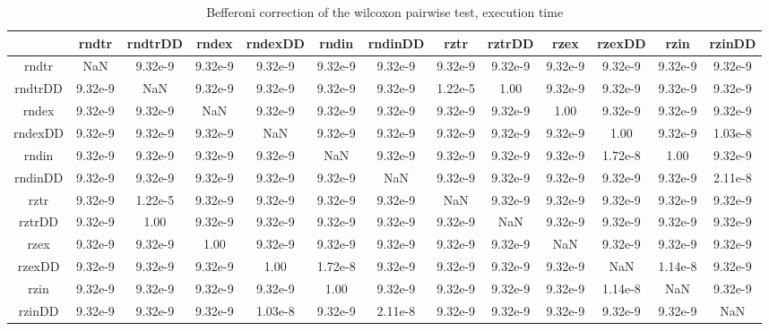 \documentclass[12pt,a4paper]{article}
\begin{document}
\begin{table}[!h]
\leftskip -2.45cm
{
\footnotesize
\begin{tabular}{|*{13}{c|}}
\hline
	~ & rndtr & rndtrDD & rndex & rndexDD & rndin & rndinDD & rztr & rztrDD & rzex & rzexDD & rzin & rzinDD \\
  \hline
	rndtr & NaN & 9.32e-9 & 9.32e-9 & 9.32e-9 & 9.32e-9 & 9.32e-9 & 9.32e-9 & 9.32e-9 & 9.32e-9 & 9.32e-9 & 9.32e-9 & 9.32e-9 \\
	rndtrDD & 9.32e-9 & NaN & 9.32e-9 & 9.32e-9 & 9.32e-9 & 9.32e-9 & 1.22e-5 & 1.00 & 9.32e-9 & 9.32e-9 & 9.32e-9 & 9.32e-9 \\
	rndex & 9.32e-9 & 9.32e-9 & NaN & 9.32e-9 & 9.32e-9 & 9.32e-9 & 9.32e-9 & 9.32e-9 & 1.00 & 9.32e-9 & 9.32e-9 & 9.32e-9 \\
	rndexDD & 9.32e-9 & 9.32e-9 & 9.32e-9 & NaN & 9.32e-9 & 9.32e-9 & 9.32e-9 & 9.32e-9 & 9.32e-9 & 1.00 & 9.32e-9 & 1.03e-8 \\
	rndin & 9.32e-9 & 9.32e-9 & 9.32e-9 & 9.32e-9 & NaN & 9.32e-9 & 9.32e-9 & 9.32e-9 & 9.32e-9 & 1.72e-8 & 1.00 & 9.32e-9 \\
	rndinDD & 9.32e-9 & 9.32e-9 & 9.32e-9 & 9.32e-9 & 9.32e-9 & NaN & 9.32e-9 & 9.32e-9 & 9.32e-9 & 9.32e-9 & 9.32e-9 & 2.11e-8 \\
	rztr & 9.32e-9 & 1.22e-5 & 9.32e-9 & 9.32e-9 & 9.32e-9 & 9.32e-9 & NaN & 9.32e-9 & 9.32e-9 & 9.32e-9 & 9.32e-9 & 9.32e-9 \\
	rztrDD & 9.32e-9 & 1.00 & 9.32e-9 & 9.32e-9 & 9.32e-9 & 9.32e-9 & 9.32e-9 & NaN & 9.32e-9 & 9.32e-9 & 9.32e-9 & 9.32e-9 \\
	rzex & 9.32e-9 & 9.32e-9 & 1.00 & 9.32e-9 & 9.32e-9 & 9.32e-9 & 9.32e-9 & 9.32e-9 & NaN & 9.32e-9 & 9.32e-9 & 9.32e-9 \\
	rzexDD & 9.32e-9 & 9.32e-9 & 9.32e-9 & 1.00 & 1.72e-8 & 9.32e-9 & 9.32e-9 & 9.32e-9 & 9.32e-9 & NaN & 1.14e-8 & 9.32e-9 \\
	rzin & 9.32e-9 & 9.32e-9 & 9.32e-9 & 9.32e-9 & 1.00 & 9.32e-9 & 9.32e-9 & 9.32e-9 & 9.32e-9 & 1.14e-8 & NaN & 9.32e-9 \\
	rzinDD & 9.32e-9 & 9.32e-9 & 9.32e-9 & 1.03e-8 & 9.32e-9 & 2.11e-8 & 9.32e-9 & 9.32e-9 & 9.32e-9 & 9.32e-9 & 9.32e-9 & NaN \\

  \hline
\end{tabular}
\normalsize
}
\caption{Befferoni correction of the wilcoxon pairwise test, execution time}
\label{Befferoni correction of the wilcoxon pairwise test time}
\end{table}
\end{document}
